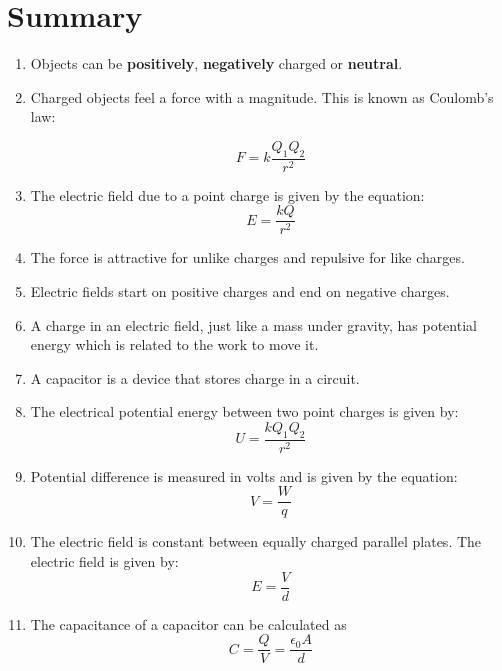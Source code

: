 \section{Summary}

\begin{enumerate}
\item Objects can be \textbf{positively}, \textbf{negatively} charged or \textbf{neutral}.
\item Charged objects feel a force with a magnitude. This is known as Coulomb's law:

\begin{equation*}
F = k \frac{Q_1Q_2}{r^2}
\end{equation*}

\item The electric field due to a point charge is given by the equation:
\begin{equation*}
E = \frac{kQ}{r^2}
\end{equation*}

\item The force is attractive for unlike charges and repulsive for
like charges.

\item Electric fields start on positive charges and end on negative
charges.

\item A charge in an electric field, just like a mass under gravity,
has potential energy which is related to the work to move it.
\item A capacitor is a device that stores charge in a circuit.

\item The electrical potential energy between two point charges is given by:
\begin{equation*}
U = \frac{kQ_{1}Q_{2}}{r^2}
\end{equation*}

\item Potential difference is measured in volts and is given by the equation:
\begin{equation*}
V = \frac{W}{q}
\end{equation*}

\item The electric field is constant between equally charged parallel
plates. The electric field is given by:
\begin{equation*}
E = \frac{V}{d}
\end{equation*}

\item The capacitance of a capacitor can be calculated as 
\begin{equation*}
C = \frac{Q}{V} = \frac{\epsilon _{0}A}{d}
\end{equation*} 
\end{enumerate}

